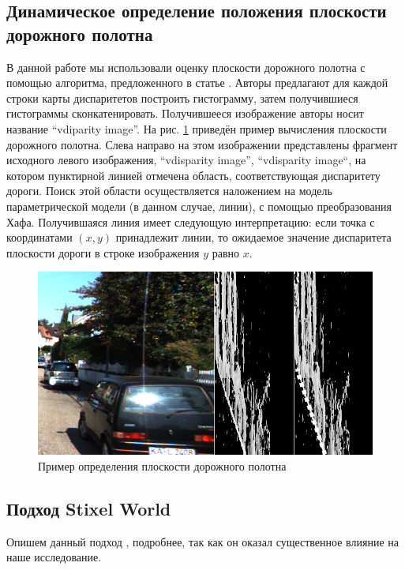 \documentclass[aps,%
14pt,%
final,%
oneside,
onecolumn,%
musixtex, %
superscriptaddress,%
centertags]{extarticle} %
\begin{document}
\subsection{Динамическое определение положения плоскости дорожного полотна}\label{vdisparity_explanation}

В данной работе мы использовали оценку плоскости дорожного полотна с помощью алгоритма, предложенного в статье \cite{labayrade2002real}. Авторы предлагают для каждой строки карты диспаритетов построить гистограмму, затем получившиеся гистограммы сконкатенировать. Получившееся изображение авторы носит название ``vdiparity image''. На рис. \ref{fig:vdisp_example} приведён пример вычисления плоскости дорожного полотна. Слева направо на этом изображении представлены фрагмент исходного левого изображения, ``vdisparity image'', ``vdisparity image``, на котором пунктирной линией отмечена область, соответствующая диспаритету дороги. Поиск этой области осуществляется наложением на модель параметрической модели (в данном случае, линии), с помощью преобразования Хафа. Получившаяся линия имеет следующую интерпретацию: если точка с координатами $(x, y)$ принадлежит линии, то ожидаемое значение диспаритета плоскости дороги в строке изображения $y$ равно $x$.

\begin{figure}[htp]
\centering
\includegraphics[width=\textwidth]{vdisp_concat.png}
\caption{Пример определения плоскости дорожного полотна}
\label{fig:vdisp_example}
\end{figure}

\subsection{Подход Stixel World} \label{sec:stixels}

Опишем данный подход \cite{pfeiffer2010efficient}, подробнее, так как он оказал существенное влияние на наше исследование.
\end{document}
